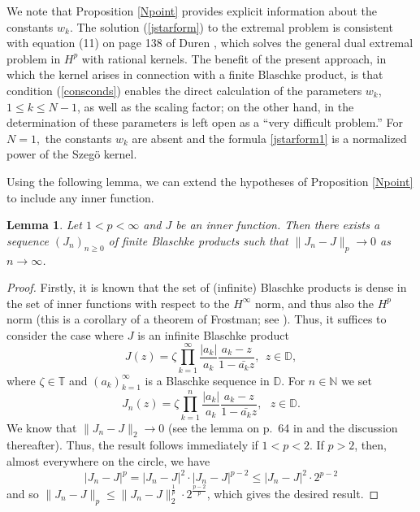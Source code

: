 \documentclass{article}
\theoremstyle{plain}
\numberwithin{Theorem}{section}
\numberwithin{equation}{section}
\theoremstyle{plain}
\newtheorem{Lemma}[Theorem]{Lemma}
\theoremstyle{definition}
\renewcommand{\leq}{\leqslant}
\newcommand{\D}{\mathbb{D}}
\newcommand{\chris}[1]{{\color{Plum}#1}}
\begin{document}
We note that Proposition \ref{Npoint} provides explicit information about the constants $w_k$. 
The solution (\ref{jstarform}) to the extremal problem is consistent with equation (11) on page 138 of Duren \cite{Duren}, which solves the general dual extremal problem in $H^p$ with rational kernels.  The benefit of the present approach, in which the kernel arises in connection with a finite Blaschke product, is that condition (\ref{consconds}) enables the direct calculation of the parameters $w_k$, $1 \leq k \leq N-1$, as well as the scaling factor; on the other hand, in \cite{Duren} the determination of these parameters is left open as a ``very difficult problem.''
For $N = 1,$ the constants $w_k$ are absent and the formula \eqref{jstarform1} is a normalized power of the Szeg\"{o} kernel.  


Using the following lemma, we can extend the hypotheses of Proposition \ref{Npoint} to include any inner function. 


\begin{Lemma}\label{FBPapprox}
	Let $1<p<\infty$ and $J$ be an inner function. Then there exists a sequence $(J_n)_{n\ge0}$ of finite Blaschke products such that $\|J_n-J\|_p\to0$ as $n \to \infty$.
\end{Lemma}
\begin{proof}
	Firstly, it is known that the set of (infinite) Blaschke products is dense in the set of inner functions with respect to the $H^\infty$ norm, and thus also the $H^p$ norm (this is a corollary of a theorem of Frostman; see \cite[Corollary 6.5]{MR628971}). Thus, it suffices to consider the case where $J$ is an infinite Blaschke product
	\[
	J(z) = \zeta\prod_{k=1}^{\infty}  \frac{|a_k|}{a_k}\frac{ a_k -z }{ 1- \bar{a_k} z }, \ \ z\in\D,
	\] 
	where $\zeta\in\mathbb{T}$ and $(a_k)_{k=1}^\infty$ is a Blaschke sequence in $\D$. For $n\in\mathbb{N}$ we set
	\[
	J_n(z)  = \zeta\prod_{k=1}^{n}\frac{|a_k|}{a_k}\frac{ a_k -z }{ 1- \bar{a_k} z }, \ \ \ z\in\D.
	\]
	We know that $\|J_n-J\|_2\to0$ (see the lemma on p.\ 64 in \cite{MR0133008} and the discussion thereafter). Thus, the result follows immediately if $1 < p < 2$. If $p>2$, then, almost everywhere on the circle, we have 
    \[
    |J_n-J|^p=|J_n-J|^2\cdot|J_n-J|^{p-2}\leq|J_n-J|^2\cdot2^{p-2}
    \]
    and so $\|J_n-J\|_p\leq\|J_n-J\|_2^{\frac{1}{p}}\cdot2^{\frac{p-2}{p}}$, which gives the desired result.
\end{proof}
\end{document}
